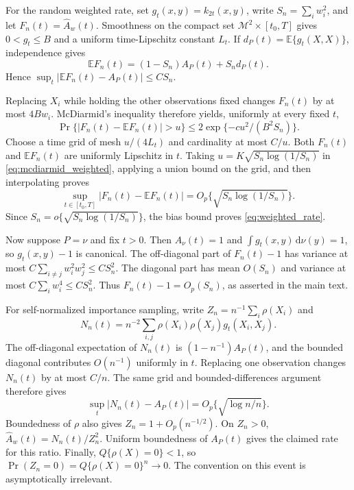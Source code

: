 \documentclass[twoside]{article}
\theoremstyle{definition}
\theoremstyle{remark}
\newcommand{\E}{\mathbb{E}}
\newcommand{\M}{\mathcal{M}}
\newcommand{\dd}{\,\mathrm{d}}
\begin{document}
For the random weighted rate, set $g_t(x,y)=k_{2t}(x,y)$, write
$S_n=\sum_iw_i^2$, and let $F_n(t)=\widehat A_w(t)$. Smoothness on the
compact set $\M^2\times[t_0,T]$ gives $0<g_t\le B$ and a uniform
time-Lipschitz constant $L_t$. If
$d_P(t)=\E\{g_t(X,X)\}$, independence gives
\begin{equation*}
  \E F_n(t)=(1-S_n)A_P(t)+S_nd_P(t).
\end{equation*}
Hence $\sup_t|\E F_n(t)-A_P(t)|\le C S_n$.

Replacing $X_i$ while holding the other observations fixed changes
$F_n(t)$ by at most $4Bw_i$. McDiarmid's inequality therefore yields,
uniformly at every fixed $t$,
\begin{equation}
  \Pr\{|F_n(t)-\E F_n(t)|>u\}
  \le 2\exp\{-c u^2/(B^2S_n)\}.
  \label{eq:mcdiarmid_weighted}
\end{equation}
Choose a time grid of mesh $u/(4L_t)$ and cardinality at most $C/u$.
Both $F_n(t)$ and $\E F_n(t)$ are uniformly Lipschitz in $t$. Taking
$u=K\sqrt{S_n\log(1/S_n)}$ in \eqref{eq:mcdiarmid_weighted}, applying a
union bound on the grid, and then interpolating proves
\begin{equation*}
  \sup_{t\in[t_0,T]}|F_n(t)-\E F_n(t)|
  =O_p\{\sqrt{S_n\log(1/S_n)}\}.
\end{equation*}
Since $S_n=o\{\sqrt{S_n\log(1/S_n)}\}$, the bias bound proves
\eqref{eq:weighted_rate}.

Now suppose $P=\nu$ and fix $t>0$. Then $A_\nu(t)=1$ and
$\int g_t(x,y)\dd\nu(y)=1$, so $g_t(x,y)-1$ is canonical. The
off-diagonal part of $F_n(t)-1$ has variance at most
$C\sum_{i\ne j}w_i^2w_j^2\le CS_n^2$. The diagonal part has mean
$O(S_n)$ and variance at most $C\sum_iw_i^4\le CS_n^2$. Thus
$F_n(t)-1=O_p(S_n)$, as asserted in the main text.

For self-normalized importance sampling, write $Z_n=n^{-1}\sum_i\rho(X_i)$ and
\begin{equation*}
  N_n(t)=n^{-2}\sum_{i,j}\rho(X_i)\rho(X_j)g_t(X_i,X_j).
\end{equation*}
The off-diagonal expectation of $N_n(t)$ is $(1-n^{-1})A_P(t)$, and
the bounded diagonal contributes $O(n^{-1})$ uniformly in $t$. Replacing
one observation changes $N_n(t)$ by at most $C/n$. The same grid and
bounded-differences argument therefore gives
\begin{equation*}
  \sup_t|N_n(t)-A_P(t)|=O_p\{\sqrt{\log n/n}\}.
\end{equation*}
Boundedness of $\rho$ also gives $Z_n=1+O_p(n^{-1/2})$. On $Z_n>0$, $\widehat A_w(t)=N_n(t)/Z_n^2$. Uniform boundedness of $A_P(t)$ gives the claimed rate for this ratio. Finally, $Q\{\rho(X)=0\}<1$, so $\Pr(Z_n=0)=Q\{\rho(X)=0\}^n\to0$. The convention on this event is asymptotically irrelevant.
\end{document}
